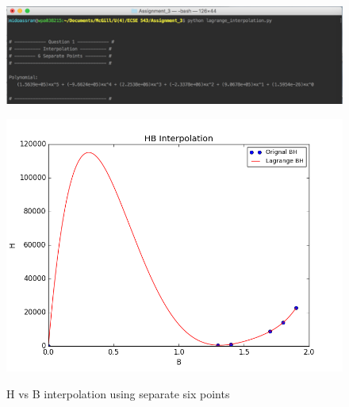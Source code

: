\documentclass[11pt]{article}
\begin{document}
\begin{figure}[!hbp]
	\begin{center}
		\begin{minipage}{ \textwidth}
			\includegraphics[width= \textwidth]{o_L_HB_sep_six.png}\\
		\end{minipage}
		\begin{minipage}{ \textwidth}
			\includegraphics[width=\textwidth]{L_HB_sep_six.png}\\
		\end{minipage}
		\caption{\label{fig:L_HB_sep_six}H vs B interpolation using separate six points}
	\end{center}
\end{figure}

\FloatBarrier
\end{document}
